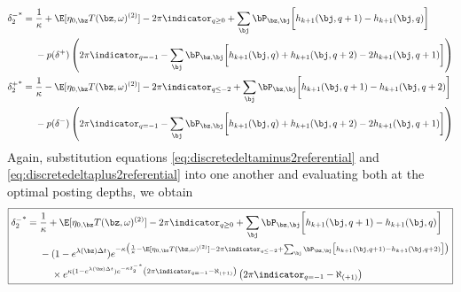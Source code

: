 \documentclass[12pt]{article}
\begin{document}
\begin{align}
\label{eq:discretedeltaminus2referential}
\begin{split}
{\delta_{2}^{-}}^* & = \frac{1}{\kappa} + \E[\eta_{0,\bz} T(\bz, \omega)^{(2)}] - 2 \pi \indicator_{q \geq 0} + \sum_\bj \bP_{\bz,\bj} \biggl[ h_{k+1}(\bj, q+1) - h_{k+1}(\bj, q) \biggr] \\
& \hphantom{{}={}} -p(\delta^+) \left( 2 \pi \indicator_{q = -1} - \sum_\bj \bP_{\bz,\bj} \biggl[ h_{k+1}(\bj, q) + h_{k+1}(\bj, q+2) -2 h_{k+1}(\bj, q+1)  \biggr] \right)
\end{split} \\
\begin{split}
\label{eq:discretedeltaplus2referential}
{\delta_{2}^+}^* & = \frac{1}{\kappa} - \E[\eta_{0,\bz} T(\bz, \omega)^{(2)}] - 2 \pi \indicator_{q \leq -2} + \sum_\bj \bP_{\bz,\bj} \biggl[ h_{k+1}(\bj, q+1) - h_{k+1}(\bj, q+2) \biggr] \\
& \hphantom{{}={}} -p(\delta^-) \left( 2 \pi \indicator_{q = -1} - \sum_\bj \bP_{\bz,\bj} \biggl[ h_{k+1}(\bj, q) + h_{k+1}(\bj, q+2) -2 h_{k+1}(\bj, q+1)  \biggr] \right)
\end{split}
\end{align}
Again, substitution equations \ref{eq:discretedeltaminus2referential} and \ref{eq:discretedeltaplus2referential} into one another and evaluating both at the optimal posting depths, we obtain
\begin{equation}
\label{eq:discretedeltaminus2feedback}
\boxed{
\begin{split}
{\delta_{2}^-}^* & = \frac{1}{\kappa} + \E[\eta_{0,\bz} T(\bz, \omega)^{(2)}] - 2 \pi \indicator_{q \geq 0} + \sum_\bj \bP_{\bz,\bj} \biggl[ h_{k+1}(\bj, q+1) - h_{k+1}(\bj, q) \biggr] \\
& \hphantom{{}={}} - (1-e^{\lambda (\bz) \Delta t})e^{-\kappa \bigl( \frac{1}{\kappa} - \E[\eta_{0,\bz} T(\bz, \omega)^{(2)}] - 2 \pi \indicator_{q \leq -2} + \sum_\bj \bP_{\bz,\bj} \bigl[ h_{k+1}(\bj, q+1) - h_{k+1}(\bj, q+2) \bigr] \bigr) } \\
& \hphantom{{}={} {}-{}} \times e^{\kappa (1-e^{\lambda (\bz) \Delta t})e^{-\kappa {\delta_{2}^-}^*} \left( 2 \pi \indicator_{q = -1} - \aleph_{(+1)} \right)} \left( 2 \pi \indicator_{q = -1} - \aleph_{(+1)} \right)
\end{split}
}
\end{equation}
\end{document}
